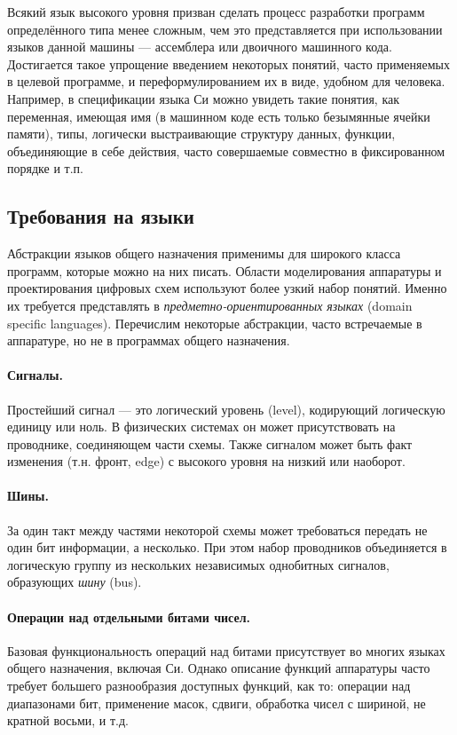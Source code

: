Всякий язык высокого уровня призван сделать процесс разработки программ определённого типа менее сложным, чем это представляется при использовании языков данной машины --- ассемблера или двоичного машинного кода. Достигается такое упрощение введением некоторых понятий, часто применяемых в целевой программе, и переформулированием их в виде, удобном для человека. Например, в спецификации языка Си можно увидеть такие понятия, как переменная, имеющая имя (в машинном коде есть только безымянные ячейки памяти), типы, логически выстраивающие структуру данных, функции, объединяющие в себе действия, часто совершаемые совместно в фиксированном порядке и т.п. 

\subsection{Требования на языки}

Абстракции языков общего назначения применимы для широкого класса программ, которые можно на них писать. Области моделирования аппаратуры и проектирования цифровых схем используют более узкий набор понятий. Именно их требуется представлять в \emph{предметно-ориентированных языках} (\abbr domain specific languages). Перечислим некоторые абстракции, часто встречаемые в аппаратуре, но не в программах общего назначения. 

\paragraph{Сигналы.} Простейший сигнал --- это логический уровень (\abbr level), кодирующий логическую единицу или ноль. В физических системах он может присутствовать на проводнике, соединяющем части схемы. Также сигналом может быть факт изменения (т.н. фронт, \abbr edge) с высокого уровня на низкий или наоборот.

\paragraph{Шины.} За один такт между частями некоторой схемы может требоваться передать не один бит информации, а несколько. При этом набор проводников объединяется в логическую группу из нескольких независимых однобитных сигналов, образующих \emph{шину} (\abbr bus).

\paragraph{Операции над отдельными битами чисел.} Базовая функциональность операций над битами присутствует во многих языках общего назначения, включая Си. Однако описание функций аппаратуры часто требует большего разнообразия доступных функций, как то: операции над диапазонами бит, применение масок, сдвиги, обработка чисел с шириной, не кратной восьми, и т.д.

